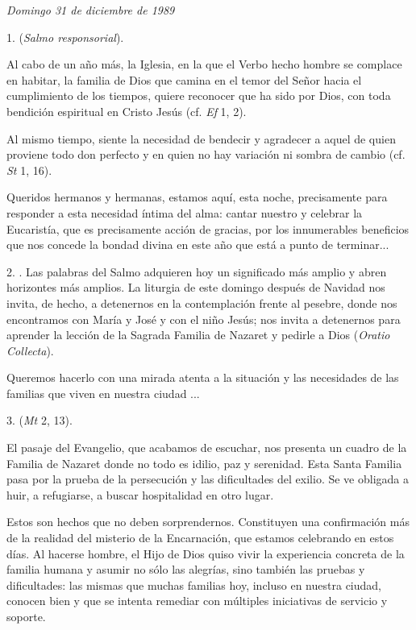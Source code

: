 \begin{body}
	\emph{Domingo 31 de diciembre de 1989}
	
	\begin{body}
		1.  (\emph{Salmo responsorial}).
		
		Al cabo de un año más, la Iglesia,  en la que el Verbo hecho hombre se complace en habitar, la familia de Dios que camina en el temor del Señor hacia el cumplimiento de los tiempos, quiere reconocer que ha sido  por Dios, con toda bendición espiritual en Cristo Jesús (cf. \emph{Ef} 1, 2).
		
		Al mismo tiempo, siente la necesidad de bendecir y agradecer a aquel de quien proviene todo don perfecto y en quien no hay variación ni sombra de cambio (cf. \emph{St} 1, 16).
		
		Queridos hermanos y hermanas, estamos aquí, esta noche, precisamente para responder a esta necesidad íntima del alma: cantar nuestro  y celebrar la Eucaristía, que es precisamente acción de gracias, por los innumerables beneficios que nos concede la bondad divina en este año que está a punto de terminar...
		
		2. . Las palabras del Salmo adquieren hoy un significado más amplio y abren horizontes más amplios. La liturgia de este domingo después de Navidad nos invita, de hecho, a detenernos en la contemplación frente al pesebre, donde nos encontramos con María y José y con el niño Jesús; nos invita a detenernos para aprender la lección de la Sagrada Familia de Nazaret y pedirle a Dios  (\emph{Oratio Collecta}).
		
		Queremos hacerlo con una mirada atenta a la situación y las necesidades de las familias que viven en nuestra ciudad ...
		
		3.  (\emph{Mt} 2, 13).
		
		El pasaje del Evangelio, que acabamos de escuchar, nos presenta un cuadro de la Familia de Nazaret donde no todo es idilio, paz y serenidad. Esta Santa Familia pasa por la prueba de la persecución y las dificultades del exilio. Se ve obligada a huir, a refugiarse, a buscar hospitalidad en otro lugar.
		
		Estos son hechos que no deben sorprendernos. Constituyen una confirmación más de la realidad del misterio de la Encarnación, que estamos celebrando en estos días. Al hacerse hombre, el Hijo de Dios quiso vivir la experiencia concreta de la familia humana y asumir no sólo las alegrías, sino también las pruebas y dificultades: las mismas que muchas familias hoy, incluso en nuestra ciudad, conocen bien y que se intenta remediar con múltiples iniciativas de servicio y soporte.
		

\end{body}
\end{body}
